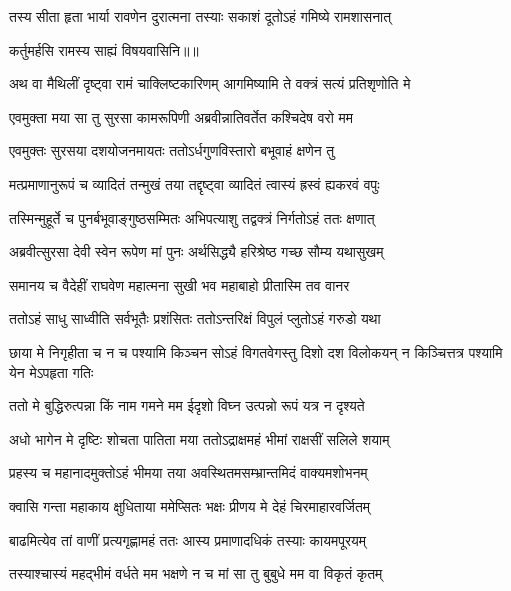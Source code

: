 \twolineshloka
{तस्य सीता हृता भार्या रावणेन दुरात्मना}
{तस्याः सकाशं दूतोऽहं गमिष्ये रामशासनात्} %

{कर्तुमर्हसि रामस्य साह्यं विषयवासिनि॥॥} %

\addtocounter{shlokacount}{1}

\twolineshloka
{अथ वा मैथिलीं दृष्ट्वा रामं चाक्लिष्टकारिणम्}
{आगमिष्यामि ते वक्त्रं सत्यं प्रतिशृणोति मे} %

\twolineshloka
{एवमुक्ता मया सा तु सुरसा कामरूपिणी}
{अब्रवीन्नातिवर्तेत कश्चिदेष वरो मम} %

\twolineshloka
{एवमुक्तः सुरसया दशयोजनमायतः}
{ततोऽर्धगुणविस्तारो बभूवाहं क्षणेन तु} %

\twolineshloka
{मत्प्रमाणानुरूपं च व्यादितं तन्मुखं तया}
{तद्दृष्ट्वा व्यादितं त्वास्यं ह्रस्वं ह्यकरवं वपुः} %

\twolineshloka
{तस्मिन्मुहूर्ते च पुनर्बभूवाङ्गुष्ठसम्मितः}
{अभिपत्याशु तद्वक्त्रं निर्गतोऽहं ततः क्षणात्} %

\twolineshloka
{अब्रवीत्सुरसा देवी स्वेन रूपेण मां पुनः}
{अर्थसिद्ध्यै हरिश्रेष्ठ गच्छ सौम्य यथासुखम्} %

\twolineshloka
{समानय च वैदेहीं राघवेण महात्मना}
{सुखी भव महाबाहो प्रीतास्मि तव वानर} %

\twolineshloka
{ततोऽहं साधु साध्वीति सर्वभूतैः प्रशंसितः}
{ततोऽन्तरिक्षं विपुलं प्लुतोऽहं गरुडो यथा} %

\threelineshloka
{छाया मे निगृहीता च न च पश्यामि किञ्चन}
{सोऽहं विगतवेगस्तु दिशो दश विलोकयन्}
{न किञ्चित्तत्र पश्यामि येन मेऽपहृता गतिः} %

\twolineshloka
{ततो मे बुद्धिरुत्पन्ना किं नाम गमने मम}
{ईदृशो विघ्न उत्पन्नो रूपं यत्र न दृश्यते} %

\twolineshloka
{अधो भागेन मे दृष्टिः शोचता पातिता मया}
{ततोऽद्राक्षमहं भीमां राक्षसीं सलिले शयाम्} %

\twolineshloka
{प्रहस्य च महानादमुक्तोऽहं भीमया तया}
{अवस्थितमसम्भ्रान्तमिदं वाक्यमशोभनम्} %

\twolineshloka
{क्वासि गन्ता महाकाय क्षुधिताया ममेप्सितः}
{भक्षः प्रीणय मे देहं चिरमाहारवर्जितम्} %

\twolineshloka
{बाढमित्येव तां वाणीं प्रत्यगृह्णामहं ततः}
{आस्य प्रमाणादधिकं तस्याः कायमपूरयम्} %

\twolineshloka
{तस्याश्चास्यं महद्भीमं वर्धते मम भक्षणे}
{न च मां सा तु बुबुधे मम वा विकृतं कृतम्} %

